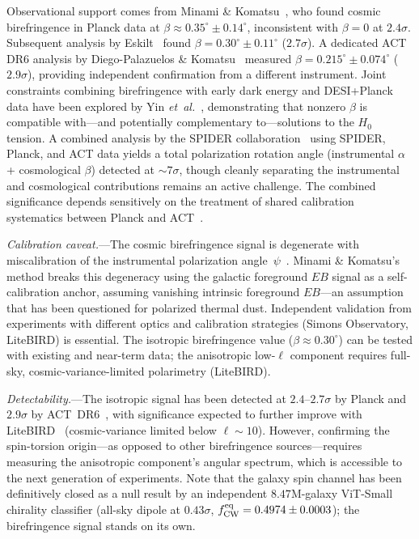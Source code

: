 \documentclass[aps,prd,twocolumn,superscriptaddress,showpacs,preprintnumbers,nofootinbib,longbibliography,floatfix]{revtex4-2}
\newcommand{\etal}{\textit{et~al.}}
\newcommand{\fcw}{f_{\rm CW}}
\begin{document}
Observational support comes from Minami \& Komatsu~\cite{Minami2020}, who found cosmic birefringence in Planck data at $\beta\approx 0.35^\circ\pm 0.14^\circ$, inconsistent with $\beta=0$ at $2.4\sigma$. Subsequent analysis by Eskilt~\cite{Eskilt2022} found $\beta = 0.30^\circ \pm 0.11^\circ$ ($2.7\sigma$). A dedicated ACT DR6 analysis by Diego-Palazuelos \& Komatsu~\cite{DiegoPalazuelos2025} measured $\beta = 0.215^\circ \pm 0.074^\circ$ ($2.9\sigma$), providing independent confirmation from a different instrument. Joint constraints combining birefringence with early dark energy and DESI+Planck data have been explored by Yin \etal~\cite{Yin2026}, demonstrating that nonzero $\beta$ is compatible with---and potentially complementary to---solutions to the $H_0$ tension. A combined analysis by the SPIDER collaboration~\cite{SPIDER2025} using SPIDER, Planck, and ACT data yields a total polarization rotation angle (instrumental $\alpha$ + cosmological $\beta$) detected at ${\sim}7\sigma$, though cleanly separating the instrumental and cosmological contributions remains an active challenge. The combined significance depends sensitively on the treatment of shared calibration systematics between Planck and ACT~\cite{ACT2024}.

\textit{Calibration caveat.}---The cosmic birefringence signal is degenerate with miscalibration of the instrumental polarization angle~$\psi$~\cite{Minami2020}. Minami \& Komatsu's method breaks this degeneracy using the galactic foreground $EB$ signal as a self-calibration anchor, assuming vanishing intrinsic foreground $EB$---an assumption that has been questioned for polarized thermal dust. Independent validation from experiments with different optics and calibration strategies (Simons Observatory, LiteBIRD) is essential. The isotropic birefringence value ($\beta\approx 0.30^\circ$) can be tested with existing and near-term data; the anisotropic low-$\ell$ component requires full-sky, cosmic-variance-limited polarimetry (LiteBIRD).

\textit{Detectability.}---The isotropic signal has been detected at $2.4$--$2.7\sigma$ by Planck and $2.9\sigma$ by ACT~DR6~\cite{DiegoPalazuelos2025}, with significance expected to further improve with LiteBIRD~\cite{LiteBIRD2023} (cosmic-variance limited below $\ell\sim 10$). However, confirming the spin-torsion origin---as opposed to other birefringence sources---requires measuring the anisotropic component's angular spectrum, which is accessible to the next generation of experiments. Note that the galaxy spin channel has been definitively closed as a null result by an independent $8.47$M-galaxy ViT-Small chirality classifier (all-sky dipole at $0.43\sigma$, $\fcw^{\rm eq} = 0.4974 \pm 0.0003$); the birefringence signal stands on its own.
\end{document}
